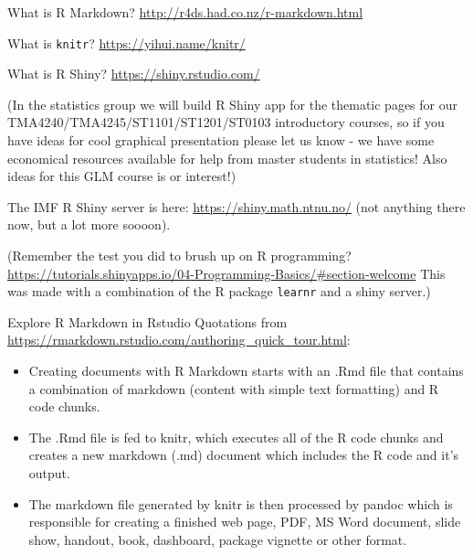 \documentclass[
  ignorenonframetext,
]{beamer}
\providecommand{\tightlist}{%
  \setlength{\itemsep}{0pt}\setlength{\parskip}{0pt}}
\begin{document}
\begin{frame}[fragile]
\begin{block}{What is R Markdown?}
\label{what-is-r-markdown}
\url{http://r4ds.had.co.nz/r-markdown.html}
\end{block}

\begin{block}{What is \texttt{knitr}?}
\label{what-is-knitr}
\url{https://yihui.name/knitr/}
\end{block}

\begin{block}{What is R Shiny?}
\label{what-is-r-shiny}
\url{https://shiny.rstudio.com/}

(In the statistics group we will build R Shiny app for the thematic
pages for our TMA4240/TMA4245/ST1101/ST1201/ST0103 introductory courses,
so if you have ideas for cool graphical presentation please let us know
- we have some economical resources available for help from master
students in statistics! Also ideas for this GLM course is or interest!)

The IMF R Shiny server is here: \url{https://shiny.math.ntnu.no/} (not
anything there now, but a lot more soooon).

(Remember the test you did to brush up on R programming?
\url{https://tutorials.shinyapps.io/04-Programming-Basics/\#section-welcome}
This was made with a combination of the R package \texttt{learnr} and a
shiny server.)
\end{block}
\end{frame}

\begin{frame}
\begin{block}{Explore R Markdown in Rstudio}
\label{explore-r-markdown-in-rstudio}
Quotations from
\url{https://rmarkdown.rstudio.com/authoring_quick_tour.html}:

\begin{itemize}
\tightlist
\item
  Creating documents with R Markdown starts with an .Rmd file that
  contains a combination of markdown (content with simple text
  formatting) and R code chunks.
\item
  The .Rmd file is fed to knitr, which executes all of the R code chunks
  and creates a new markdown (.md) document which includes the R code
  and it's output.
\item
  The markdown file generated by knitr is then processed by pandoc which
  is responsible for creating a finished web page, PDF, MS Word
  document, slide show, handout, book, dashboard, package vignette or
  other format.
\end{itemize}
\end{block}
\end{frame}
\end{document}
